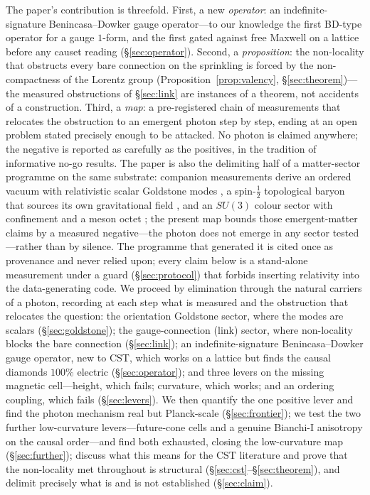 \documentclass[aps,prd,reprint,nofootinbib,superscriptaddress,floatfix]{revtex4-2}
\newcounter{proposition}
\begin{document}
The paper's contribution is threefold. First, a new \emph{operator}: an
indefinite-signature Benincasa--Dowker gauge operator---to our knowledge the first
BD-type operator for a gauge $1$-form, and the first gated against free Maxwell on a
lattice before any causet reading (\S\ref{sec:operator}). Second, a
\emph{proposition}: the non-locality that obstructs every bare connection on the
sprinkling is forced by the non-compactness of the Lorentz group
(Proposition~\ref{prop:valency}, \S\ref{sec:theorem})---the measured obstructions of
\S\ref{sec:link} are instances of a theorem, not accidents of a construction. Third, a
\emph{map}: a pre-registered chain of measurements that relocates the obstruction to an
emergent photon step by step, ending at an open problem stated precisely enough to be
attacked. No photon is claimed anywhere; the negative is reported as carefully as the
positives, in the tradition of informative no-go results. The paper is also the
delimiting half of a matter-sector programme on the same substrate: companion
measurements derive an ordered vacuum with relativistic scalar Goldstone modes
\cite{GoldstonePRD}, a spin-$\tfrac12$ topological baryon that sources its own
gravitational field \cite{MatterGravityPRD}, and an $SU(3)$ colour sector with
confinement and a meson octet \cite{SU3PRD}; the present map bounds those
emergent-matter claims by a measured negative---the photon does not emerge in any
sector tested---rather than by silence. The programme that
generated it \cite{TEICDoc1} is cited once as provenance and never relied upon; every
claim below is a stand-alone measurement under a guard (\S\ref{sec:protocol}) that
forbids inserting relativity into the data-generating code. We proceed by elimination
through the natural carriers of a photon, recording at each step what is measured and
the obstruction that relocates the question:
the orientation Goldstone sector, where the modes are scalars (\S\ref{sec:goldstone});
the gauge-connection (link) sector, where non-locality blocks the bare connection
(\S\ref{sec:link}); an indefinite-signature Benincasa--Dowker gauge operator, new to
CST, which works on a lattice but finds the causal diamonds $100\%$ electric
(\S\ref{sec:operator}); and three levers on the missing magnetic cell---height, which
fails; curvature, which works; and an ordering coupling, which fails
(\S\ref{sec:levers}). We then quantify the one positive lever and find the photon
mechanism real but Planck-scale (\S\ref{sec:frontier}); we test the two further
low-curvature levers---future-cone cells and a genuine Bianchi-I anisotropy on the causal
order---and find both exhausted, closing the low-curvature map (\S\ref{sec:further});
discuss what this means for the
CST literature and prove that the non-locality met throughout is structural
(\S\ref{sec:cst}--\S\ref{sec:theorem}), and delimit precisely what is and is not
established (\S\ref{sec:claim}).
\end{document}
